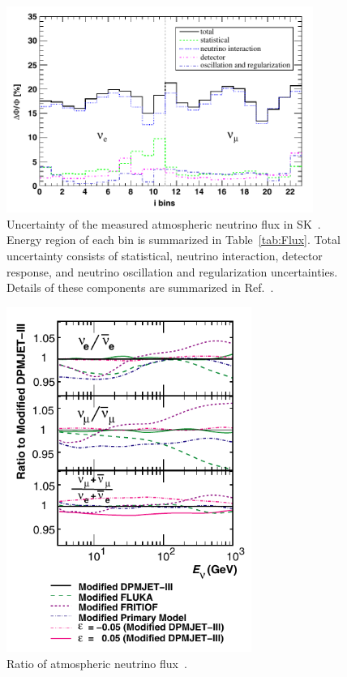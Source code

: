 \begin{figure}[p]
	\centering
	\includegraphics[width=10cm]{Figures/NCQE/Flux_error}
	\caption[Uncertainty of the measured atmospheric neutrino flux in SK]{
	Uncertainty of the measured atmospheric neutrino flux in SK~\cite{2016Richard}.
	Energy region of each bin is summarized in Table~\ref{tab:Flux}.
	Total uncertainty consists of statistical, neutrino interaction, detector response, and neutrino oscillation and regularization uncertainties.
	Details of these components are summarized in Ref.~\cite{2016Richard}.
	}\label{Flux_error}
\end{figure}

\begin{figure}[p]
	\centering
	\includegraphics[width=8cm]{Figures/NCQE/Flux_ratio}
	\caption[Ratio of atmospheric neutrino flux]{
	Ratio of atmospheric neutrino flux~\cite{2007Honda}.
	}\label{Flux_ratio}
\end{figure}


